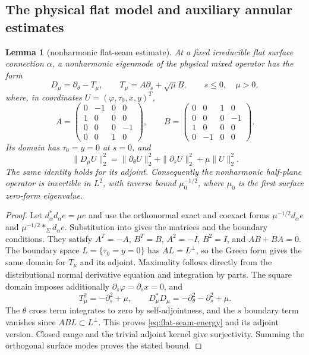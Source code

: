 \documentclass[11pt]{amsart}
\newtheorem{lemma}[theorem]{Lemma}
\theoremstyle{definition}
\theoremstyle{remark}
\theoremstyle{plain}
\begin{document}
\subsection{The physical flat model and auxiliary annular estimates}
\begin{lemma}[nonharmonic flat-seam estimate]\label{lem:flat-seam-operator}
At a fixed irreducible flat surface connection $\alpha$, a nonharmonic
eigenmode of the physical mixed operator has the form
\[
 D_\mu=\partial_\theta-T_\mu,\qquad
 T_\mu=A\partial_s+\sqrt\mu B,\qquad s\leq0,\quad\mu>0,
\]
where, in coordinates $U=(\varphi,\tau_0,x,y)^T$,
\[
 A=\begin{pmatrix}0&-1&0&0\\1&0&0&0\\0&0&0&-1\\0&0&1&0\end{pmatrix},
 \qquad
 B=\begin{pmatrix}0&0&1&0\\0&0&0&-1\\1&0&0&0\\0&-1&0&0\end{pmatrix}.
\]
Its domain has $\tau_0=y=0$ at $s=0$, and
\begin{equation}\label{eq:flat-seam-energy}
 \|D_\mu U\|_2^2
 =\|\partial_\theta U\|_2^2+\|\partial_s U\|_2^2+\mu\|U\|_2^2.
\end{equation}
The same identity holds for its adjoint. Consequently the nonharmonic
half-plane operator is invertible in $L^2$, with inverse bound
$\mu_0^{-1/2}$, where $\mu_0$ is the first surface zero-form eigenvalue.
\end{lemma}

\begin{proof}
Let $d_\alpha^*d_\alpha e=\mu e$ and use the orthonormal exact and
coexact forms $\mu^{-1/2}d_\alpha e$ and
$\mu^{-1/2}*_\Sigma d_\alpha e$. Substitution into
\cite[(5.5)--(5.7)]{DaeFukLip21b} gives the matrices and the boundary
conditions. They satisfy
$A^T=-A$, $B^T=B$, $A^2=-I$, $B^2=I$, and $AB+BA=0$.
The boundary space $L=\{\tau_0=y=0\}$ has $AL=L^\perp$, so the
Green form gives the same domain for $T_\mu$ and its adjoint.
Maximality follows directly from the distributional normal derivative
equation and integration by parts. The square domain imposes additionally
$\partial_s\varphi=\partial_sx=0$, and
\[
 T_\mu^2=-\partial_s^2+\mu,\qquad
 D_\mu^*D_\mu=-\partial_\theta^2-\partial_s^2+\mu.
\]
The $\theta$ cross term integrates to zero by self-adjointness, and
the $s$ boundary term vanishes since $AB L\subset L^\perp$.
This proves \eqref{eq:flat-seam-energy} and its adjoint version.
Closed range and the trivial adjoint kernel give surjectivity.
Summing the orthogonal surface modes proves the stated bound.
\end{proof}
\end{document}
